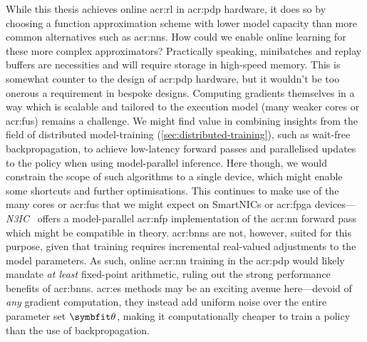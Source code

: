 While this thesis achieves online \gls{acr:rl} in \gls{acr:pdp} hardware, it does so by choosing a function approximation scheme with lower model capacity than more common alternatives such as \glspl{acr:nn}.
How could we enable online learning for these more complex approximators?
Practically speaking, minibatches and replay buffers are necessities and will require storage in high-speed memory.
This is somewhat counter to the design of \gls{acr:pdp} hardware, but it wouldn't be too onerous a requirement in bespoke designs.
Computing gradients themselves in a way which is scalable and tailored to the execution model (many weaker cores or \glspl{acr:fu}) remains a challenge.
We might find value in combining insights from the field of distributed model-training (\cref{sec:distributed-training}), such as wait-free backpropagation, to achieve low-latency forward passes and parallelised updates to the policy when using model-parallel inference.
Here though, we would constrain the scope of such algorithms to a single device, which might enable some shortcuts and further optimisations.
This continues to make use of the many cores or \glspl{acr:fu} that we might expect on SmartNICs or \gls{acr:fpga} devices---\emph{N3IC}~\parencite{DBLP:journals/corr/abs-2009-02353} offers a model-parallel \gls{acr:nfp} implementation of the \gls{acr:nn} forward pass which might be compatible in theory.
\glspl{acr:bnn} are not, however, suited for this purpose, given that training requires incremental real-valued adjustments to the model parameters.
As such, online \gls{acr:nn} training in the \gls{acr:pdp} would likely mandate \emph{at least} fixed-point arithmetic, ruling out the strong performance benefits of \glspl{acr:bnn}.
\gls{acr:es} methods may be an exciting avenue here---devoid of \emph{any} gradient computation, they instead add uniform noise over the entire parameter set $\wvec{}$, making it computationally cheaper to train a policy than the use of backpropagation.


